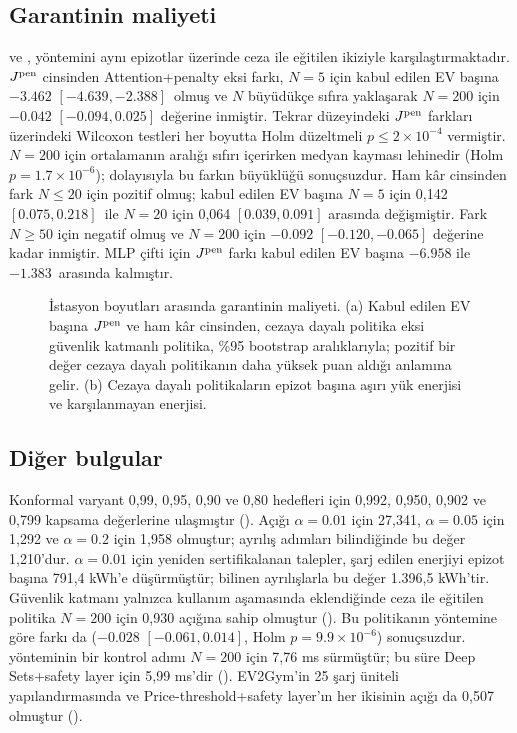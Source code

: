 \subsection{Garantinin maliyeti}\label{sec:res-cost}

 ve , \method{} yöntemini aynı epizotlar üzerinde ceza ile eğitilen ikiziyle karşılaştırmaktadır.
$J^{\mathrm{pen}}$ cinsinden Attention+penalty eksi \method{} farkı, $N=5$ için kabul edilen EV başına $-3.462$ $[-4.639,-2.388]$\,\texteuro{} olmuş ve $N$ büyüdükçe sıfıra yaklaşarak $N=200$ için $-0.042$ $[-0.094,0.025]$ değerine inmiştir.
Tekrar düzeyindeki $J^{\mathrm{pen}}$ farkları üzerindeki Wilcoxon testleri her boyutta Holm düzeltmeli $p\le2\times10^{-4}$ vermiştir.
$N=200$ için ortalamanın aralığı sıfırı içerirken medyan kayması \method{} lehinedir (Holm $p=1.7\times10^{-6}$); dolayısıyla bu farkın büyüklüğü sonuçsuzdur.
Ham kâr cinsinden fark $N\le20$ için pozitif olmuş; kabul edilen EV başına $N=5$ için 0,142 $[0.075,0.218]$\,\texteuro{} ile $N=20$ için 0,064 $[0.039,0.091]$ arasında değişmiştir.
Fark $N\ge50$ için negatif olmuş ve $N=200$ için $-0.092$ $[-0.120,-0.065]$ değerine kadar inmiştir.
MLP çifti için $J^{\mathrm{pen}}$ farkı kabul edilen EV başına $-6.958$ ile $-1.383$\,\texteuro{} arasında kalmıştır.

\begin{figure}[t]
\centering
{}
\caption{İstasyon boyutları arasında garantinin maliyeti. (a) Kabul edilen EV başına $J^{\mathrm{pen}}$ ve ham kâr cinsinden, cezaya dayalı politika eksi güvenlik katmanlı politika, \%95 bootstrap aralıklarıyla; pozitif bir değer cezaya dayalı politikanın daha yüksek puan aldığı anlamına gelir. (b) Cezaya dayalı politikaların epizot başına aşırı yük enerjisi ve karşılanmayan enerjisi.}
\label{fig:cost}
\end{figure}

\subsection{Diğer bulgular}\label{sec:res-further}

Konformal varyant 0,99, 0,95, 0,90 ve 0,80 hedefleri için 0,992, 0,950, 0,902 ve 0,799 kapsama değerlerine ulaşmıştır ().
Açığı $\alpha=0.01$ için 27,341, $\alpha=0.05$ için 1,292 ve $\alpha=0.2$ için 1,958 olmuştur; ayrılış adımları bilindiğinde bu değer 1,210'dur.
$\alpha=0.01$ için yeniden sertifikalanan talepler, şarj edilen enerjiyi epizot başına 791,4 kWh'e düşürmüştür; bilinen ayrılışlarla bu değer 1.396,5 kWh'tir.
Güvenlik katmanı yalnızca kullanım aşamasında eklendiğinde ceza ile eğitilen politika $N=200$ için 0,930 açığına sahip olmuştur ().
Bu politikanın \method{} yöntemine göre farkı da ($-0.028$ $[-0.061,0.014]$, Holm $p=9.9\times10^{-6}$) sonuçsuzdur.
\method{} yönteminin bir kontrol adımı $N=200$ için 7,76 ms sürmüştür; bu süre Deep Sets+safety layer için 5,99 ms'dir ().
EV2Gym'in 25 şarj üniteli yapılandırmasında \method{} ve Price-threshold+safety layer'ın her ikisinin açığı da 0,507 olmuştur ().
